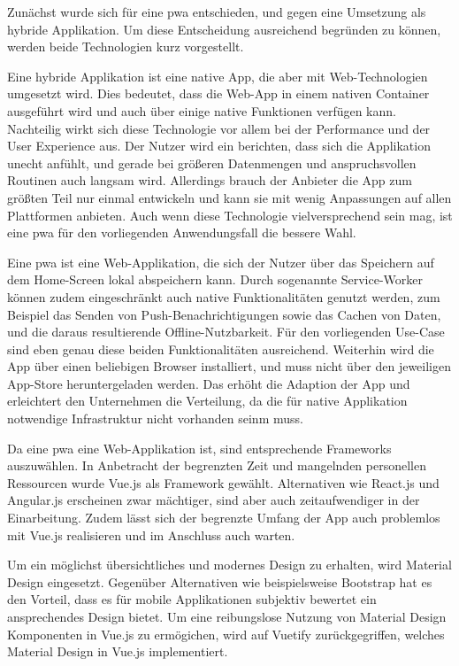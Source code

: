 Zunächst wurde sich für eine \gls{pwa} entschieden, und gegen eine Umsetzung als hybride Applikation. Um diese Entscheidung ausreichend begründen zu können, werden beide Technologien kurz vorgestellt.

Eine hybride Applikation ist eine native App, die aber mit Web-Technologien umgesetzt wird. Dies bedeutet, dass die Web-App in einem nativen Container ausgeführt wird und auch über einige native Funktionen verfügen kann. Nachteilig wirkt sich diese Technologie vor allem bei der Performance und der User Experience aus. Der Nutzer wird ein berichten, dass sich die Applikation unecht anfühlt, und gerade bei größeren Datenmengen und anspruchsvollen Routinen auch langsam wird. Allerdings brauch der Anbieter die App zum größten Teil nur einmal entwickeln und kann sie mit wenig Anpassungen auf allen Plattformen anbieten. Auch wenn diese Technologie vielversprechend sein mag, ist eine \gls{pwa} für den vorliegenden Anwendungsfall die bessere Wahl.

Eine \gls{pwa} ist eine Web-Applikation, die sich der Nutzer über das Speichern auf dem Home-Screen lokal abspeichern kann. Durch sogenannte Service-Worker können zudem eingeschränkt auch native Funktionalitäten genutzt werden, zum Beispiel das Senden von Push-Benachrichtigungen sowie das Cachen von Daten, und die daraus resultierende Offline-Nutzbarkeit. Für den vorliegenden Use-Case sind eben genau diese beiden Funktionalitäten ausreichend. Weiterhin wird die App über einen beliebigen Browser installiert, und muss nicht über den jeweiligen App-Store heruntergeladen werden. Das erhöht die Adaption der App und erleichtert den Unternehmen die Verteilung, da die für native Applikation notwendige Infrastruktur nicht vorhanden seinm muss.

Da eine \gls{pwa} eine Web-Applikation ist, sind entsprechende Frameworks auszuwählen. In Anbetracht der begrenzten Zeit und mangelnden personellen Ressourcen wurde Vue.js als Framework gewählt. Alternativen wie React.js und Angular.js erscheinen zwar mächtiger, sind aber auch zeitaufwendiger in der Einarbeitung. Zudem lässt sich der begrenzte Umfang der App auch problemlos mit Vue.js realisieren und im Anschluss auch warten.

Um ein möglichst übersichtliches und modernes Design zu erhalten, wird Material Design eingesetzt. Gegenüber Alternativen wie beispielsweise Bootstrap hat es den Vorteil, dass es für mobile Applikationen subjektiv bewertet ein ansprechendes Design bietet. Um eine reibungslose Nutzung von Material Design Komponenten in Vue.js zu ermögichen, wird auf Vuetify zurückgegriffen, welches Material Design in Vue.js implementiert.